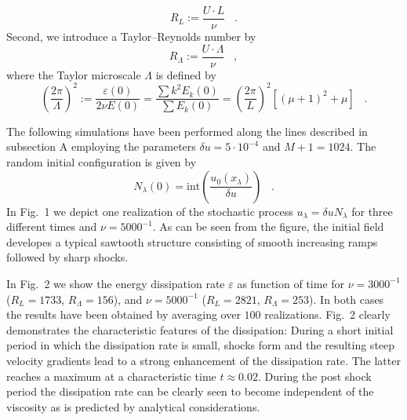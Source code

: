 \begin{equation}
R_L := \frac{U \cdot L}{\nu} \;\;\; .
\end{equation}
Second, we introduce a Taylor--Reynolds number by
\begin{equation}
R_{\Lambda} := \frac{U \cdot \Lambda}{\nu} \;\;\; ,
\end{equation}
where the Taylor microscale $\Lambda$ is defined by
\begin{equation}
\left(\frac{2\pi}{\Lambda}\right)^2 :=
\frac{\varepsilon(0)}{2\nu E(0)} =
\frac{\sum k^2 E_k(0)}{\sum E_k(0)} =
\left( \frac{2\pi}{L} \right)^2 \left[ (\mu +1)^2 + \mu \right]
\;\;\; .
\end{equation}

The following simulations have been performed along the lines
described
in subsection A employing the parameters
$\delta u = 5\cdot 10^{-4}$
and $M+1 = 1024$. The random initial configuration is given by
\begin{equation}
\label{INITB}
N_{\lambda}(0) = {\mbox{int}} \left(
\frac{u_0(x_{\lambda})}{\delta u} \right)
\;\;\; .
\end{equation}
In Fig.~1 we depict one realization of the stochastic process
$u_{\lambda} = \delta u N_{\lambda}$ for three different times and
$\nu = 5000^{-1}$. As can be seen from the figure,
the initial field developes a typical sawtooth structure
consisting of
smooth increasing ramps followed by sharp shocks.

In Fig.~2 we show
the energy dissipation rate $\varepsilon$ as function of time for 
$\nu = 3000^{-1}$ ($R_{L}= 1733$, $R_{\Lambda}= 156$),
and $\nu = 5000^{-1}$ ($R_{L}= 2821$, $R_{\Lambda}= 253$).
In both cases the results have been obtained by averaging
over $100$ realizations. Fig.~2 clearly demonstrates the
characteristic
features of the dissipation: During a short initial period in which
the dissipation rate is small, shocks form and the resulting
steep velocity gradients lead to a strong enhancement of the
dissipation
rate. The latter reaches a maximum at a characteristic time
$t \approx 0.02$.
During the post
shock period the dissipation rate can be clearly seen to
become independent
of the viscosity as is predicted by analytical
considerations\cite{KRAICHNAN,SAFFMAN}.

